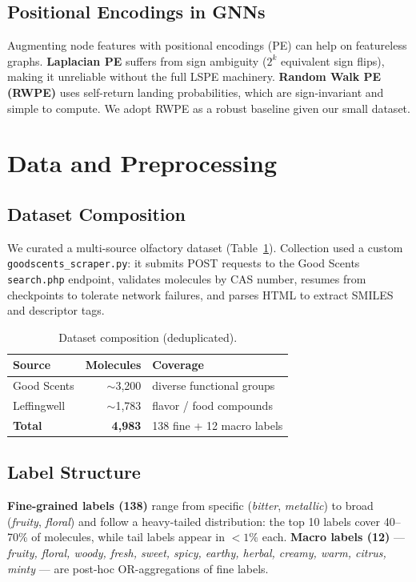 \documentclass[10pt,twocolumn]{article}
\begin{document}
\subsection{Positional Encodings in GNNs}
Augmenting node features with positional encodings (PE) can help on featureless graphs. \textbf{Laplacian PE} suffers from sign ambiguity ($2^{k}$ equivalent sign flips), making it unreliable without the full LSPE machinery. \textbf{Random Walk PE (RWPE)} uses self-return landing probabilities, which are sign-invariant and simple to compute. We adopt RWPE as a robust baseline given our small dataset.

\section{Data and Preprocessing}

\subsection{Dataset Composition}
We curated a multi-source olfactory dataset (Table~\ref{tab:data}). Collection used a custom \texttt{goodscents\_scraper.py}: it submits POST requests to the Good Scents \texttt{search.php} endpoint, validates molecules by CAS number, resumes from checkpoints to tolerate network failures, and parses HTML to extract SMILES and descriptor tags.

\begin{table}[t]
\centering\small
\caption{Dataset composition (deduplicated).}
\label{tab:data}
\begin{tabular}{lrl}
\toprule
\textbf{Source} & \textbf{Molecules} & \textbf{Coverage} \\
\midrule
Good Scents & $\sim$3{,}200 & diverse functional groups \\
Leffingwell & $\sim$1{,}783 & flavor / food compounds \\
\midrule
\textbf{Total} & \textbf{4{,}983} & 138 fine + 12 macro labels \\
\bottomrule
\end{tabular}
\end{table}

\subsection{Label Structure}
\textbf{Fine-grained labels (138)} range from specific (\emph{bitter}, \emph{metallic}) to broad (\emph{fruity}, \emph{floral}) and follow a heavy-tailed distribution: the top 10 labels cover 40--70\% of molecules, while tail labels appear in $<1\%$ each.
\textbf{Macro labels (12)} --- \emph{fruity, floral, woody, fresh, sweet, spicy, earthy, herbal, creamy, warm, citrus, minty} --- are post-hoc OR-aggregations of fine labels.
\end{document}
